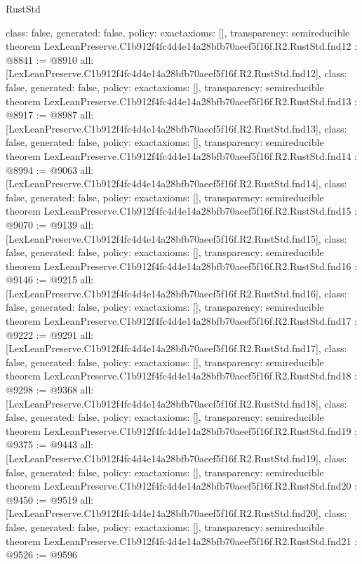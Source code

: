 \begin{lexlean}{RustStd}
\begin{coremodule}
{  class: false,
  generated: false,
  policy: exact{axioms: []},
  transparency: semireducible
}
theorem LexLeanPreserve.C1b912f4fc4d4e14a28bfb70aeef5f16f.R2.RustStd.fnd12 : @8841 := @8910 {
  all: [LexLeanPreserve.C1b912f4fc4d4e14a28bfb70aeef5f16f.R2.RustStd.fnd12],
  class: false,
  generated: false,
  policy: exact{axioms: []},
  transparency: semireducible
}
theorem LexLeanPreserve.C1b912f4fc4d4e14a28bfb70aeef5f16f.R2.RustStd.fnd13 : @8917 := @8987 {
  all: [LexLeanPreserve.C1b912f4fc4d4e14a28bfb70aeef5f16f.R2.RustStd.fnd13],
  class: false,
  generated: false,
  policy: exact{axioms: []},
  transparency: semireducible
}
theorem LexLeanPreserve.C1b912f4fc4d4e14a28bfb70aeef5f16f.R2.RustStd.fnd14 : @8994 := @9063 {
  all: [LexLeanPreserve.C1b912f4fc4d4e14a28bfb70aeef5f16f.R2.RustStd.fnd14],
  class: false,
  generated: false,
  policy: exact{axioms: []},
  transparency: semireducible
}
theorem LexLeanPreserve.C1b912f4fc4d4e14a28bfb70aeef5f16f.R2.RustStd.fnd15 : @9070 := @9139 {
  all: [LexLeanPreserve.C1b912f4fc4d4e14a28bfb70aeef5f16f.R2.RustStd.fnd15],
  class: false,
  generated: false,
  policy: exact{axioms: []},
  transparency: semireducible
}
theorem LexLeanPreserve.C1b912f4fc4d4e14a28bfb70aeef5f16f.R2.RustStd.fnd16 : @9146 := @9215 {
  all: [LexLeanPreserve.C1b912f4fc4d4e14a28bfb70aeef5f16f.R2.RustStd.fnd16],
  class: false,
  generated: false,
  policy: exact{axioms: []},
  transparency: semireducible
}
theorem LexLeanPreserve.C1b912f4fc4d4e14a28bfb70aeef5f16f.R2.RustStd.fnd17 : @9222 := @9291 {
  all: [LexLeanPreserve.C1b912f4fc4d4e14a28bfb70aeef5f16f.R2.RustStd.fnd17],
  class: false,
  generated: false,
  policy: exact{axioms: []},
  transparency: semireducible
}
theorem LexLeanPreserve.C1b912f4fc4d4e14a28bfb70aeef5f16f.R2.RustStd.fnd18 : @9298 := @9368 {
  all: [LexLeanPreserve.C1b912f4fc4d4e14a28bfb70aeef5f16f.R2.RustStd.fnd18],
  class: false,
  generated: false,
  policy: exact{axioms: []},
  transparency: semireducible
}
theorem LexLeanPreserve.C1b912f4fc4d4e14a28bfb70aeef5f16f.R2.RustStd.fnd19 : @9375 := @9443 {
  all: [LexLeanPreserve.C1b912f4fc4d4e14a28bfb70aeef5f16f.R2.RustStd.fnd19],
  class: false,
  generated: false,
  policy: exact{axioms: []},
  transparency: semireducible
}
theorem LexLeanPreserve.C1b912f4fc4d4e14a28bfb70aeef5f16f.R2.RustStd.fnd20 : @9450 := @9519 {
  all: [LexLeanPreserve.C1b912f4fc4d4e14a28bfb70aeef5f16f.R2.RustStd.fnd20],
  class: false,
  generated: false,
  policy: exact{axioms: []},
  transparency: semireducible
}
theorem LexLeanPreserve.C1b912f4fc4d4e14a28bfb70aeef5f16f.R2.RustStd.fnd21 : @9526 := @9596 {
}
\end{coremodule}
\end{lexlean}
